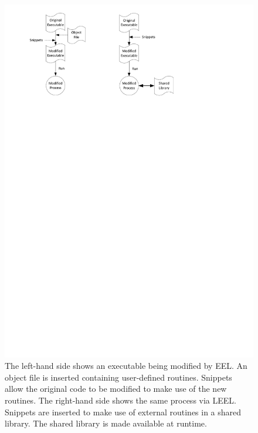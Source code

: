 \begin{figure}[H]
 \centering
 \includegraphics[viewport=60 624 406 825]{LEEL_vs_EEL.pdf}
 \caption[LEEL vs EEL]{The left-hand side shows an executable being modified by EEL. An object file is inserted containing user-defined routines. Snippets allow the original code to be modified to make use of the new routines. The right-hand side shows the same process via LEEL. Snippets are inserted to make use of external routines in a shared library. The shared library is made available at runtime.}
\end{figure}

